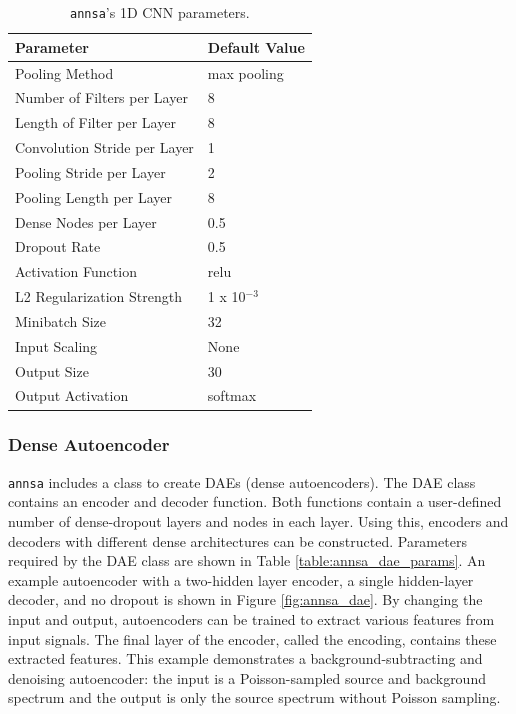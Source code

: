 \begin{table}[H]
\centering
\caption{\texttt{annsa}'s 1D CNN parameters.}
\begin{tabular}{ll}
\hline
\textbf{Parameter} & \textbf{Default Value}\\ \hline
Pooling Method & max pooling \\
Number of Filters per Layer & 8 \\
Length of Filter per Layer & 8 \\
Convolution Stride per Layer & 1 \\
Pooling Stride per Layer & 2 \\
Pooling Length per Layer & 8 \\
Dense Nodes per Layer & 0.5 \\
Dropout Rate & 0.5 \\
Activation Function & relu \\
L2 Regularization Strength & 1 x 10$^{-3}$\\ 
Minibatch Size & 32 \\ 
Input Scaling & None \\
Output Size & 30 \\
Output Activation & softmax\\ \hline
\end{tabular}
\label{table:annsa_cnn_params}
\end{table}

\subsubsection{Dense Autoencoder}

\verb|annsa| includes a class to create DAEs (dense autoencoders). The DAE class contains an encoder and decoder function. Both functions contain a user-defined number of dense-dropout layers and nodes in each layer. Using this, encoders and decoders with different dense architectures can be constructed. Parameters required by the DAE class are shown in Table \ref{table:annsa_dae_params}. An example autoencoder with a two-hidden layer encoder, a single hidden-layer decoder, and no dropout is shown in Figure \ref{fig:annsa_dae}. By changing the input and output, autoencoders can be trained to extract various features from input signals. The final layer of the encoder, called the encoding, contains these extracted features. This example demonstrates a background-subtracting and denoising autoencoder: the input is a Poisson-sampled source and background spectrum and the output is only the source spectrum without Poisson sampling.

